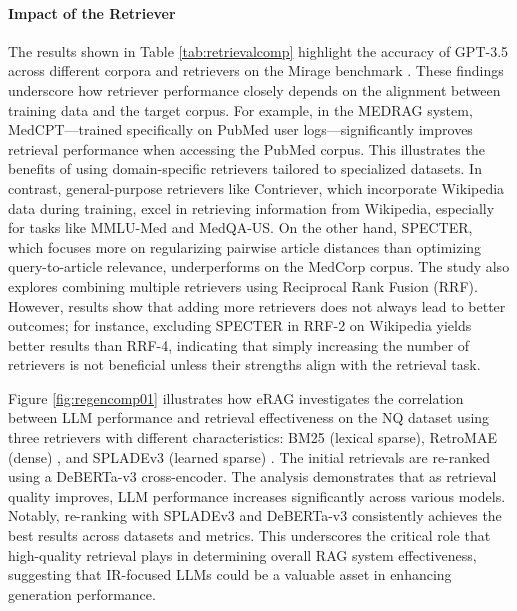 \paragraph{Impact of the Retriever} The results shown in Table \ref{tab:retrievalcomp} highlight the accuracy of GPT-3.5 across different corpora and retrievers on the Mirage benchmark \cite{xiong2024benchmarking}. These findings underscore how retriever performance closely depends on the alignment between training data and the target corpus. For example, in the MEDRAG system, MedCPT—trained specifically on PubMed user logs—significantly improves retrieval performance when accessing the PubMed corpus. This illustrates the benefits of using domain-specific retrievers tailored to specialized datasets. In contrast, general-purpose retrievers like Contriever, which incorporate Wikipedia data during training, excel in retrieving information from Wikipedia, especially for tasks like MMLU-Med and MedQA-US. On the other hand, SPECTER, which focuses more on regularizing pairwise article distances than optimizing query-to-article relevance, underperforms on the MedCorp corpus. The study also explores combining multiple retrievers using Reciprocal Rank Fusion (RRF). However, results show that adding more retrievers does not always lead to better outcomes; for instance, excluding SPECTER in RRF-2 on Wikipedia yields better results than RRF-4, indicating that simply increasing the number of retrievers is not beneficial unless their strengths align with the retrieval task.

Figure \ref{fig:regencomp01} illustrates how eRAG investigates the correlation between LLM performance and retrieval effectiveness on the NQ dataset using three retrievers with different characteristics: BM25 (lexical sparse), RetroMAE (dense) \cite{xiao2022retromae}, and SPLADEv3 (learned sparse) \cite{lassance2024spladev}. The initial retrievals are re-ranked using a DeBERTa-v3 \cite{lassance2022naver} cross-encoder. The analysis demonstrates that as retrieval quality improves, LLM performance increases significantly across various models. Notably, re-ranking with SPLADEv3 and DeBERTa-v3 consistently achieves the best results across datasets and metrics. This underscores the critical role that high-quality retrieval plays in determining overall RAG system effectiveness, suggesting that IR-focused LLMs could be a valuable asset in enhancing generation performance.

